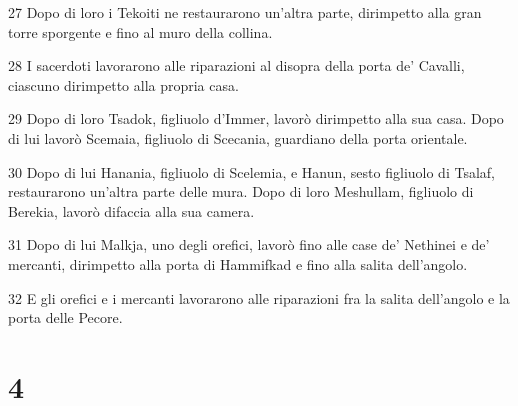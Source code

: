 \par 27 Dopo di loro i Tekoiti ne restaurarono un'altra parte, dirimpetto alla gran torre sporgente e fino al muro della collina.
\par 28 I sacerdoti lavorarono alle riparazioni al disopra della porta de' Cavalli, ciascuno dirimpetto alla propria casa.
\par 29 Dopo di loro Tsadok, figliuolo d'Immer, lavorò dirimpetto alla sua casa. Dopo di lui lavorò Scemaia, figliuolo di Scecania, guardiano della porta orientale.
\par 30 Dopo di lui Hanania, figliuolo di Scelemia, e Hanun, sesto figliuolo di Tsalaf, restaurarono un'altra parte delle mura. Dopo di loro Meshullam, figliuolo di Berekia, lavorò difaccia alla sua camera.
\par 31 Dopo di lui Malkja, uno degli orefici, lavorò fino alle case de' Nethinei e de' mercanti, dirimpetto alla porta di Hammifkad e fino alla salita dell'angolo.
\par 32 E gli orefici e i mercanti lavorarono alle riparazioni fra la salita dell'angolo e la porta delle Pecore.

\chapter{4}

